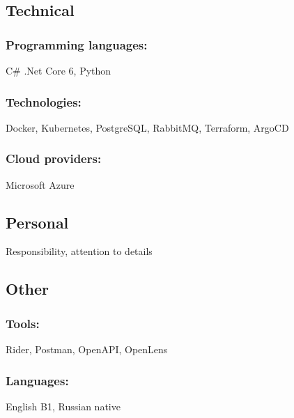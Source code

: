 \documentclass{article}
\begin{document}
\subsection{Technical}
\subsubsection{Programming languages:}
C\# .Net Core 6, Python
\subsubsection{Technologies:}
Docker, Kubernetes, PostgreSQL, RabbitMQ, Terraform, ArgoCD
\subsubsection{Cloud providers:}
Microsoft Azure

\subsection{Personal}
Responsibility, attention to details

\subsection{Other}
\subsubsection{Tools:}
Rider, Postman, OpenAPI, OpenLens
\subsubsection{Languages:}
English B1, Russian native
\end{document}
